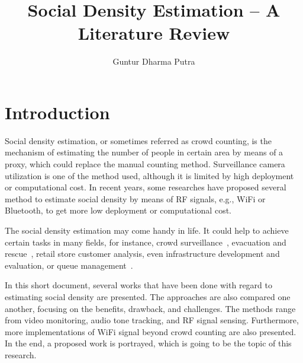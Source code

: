 \documentclass{article}
\begin{document}
\title{Social Density Estimation -- A Literature Review}
\author{Guntur Dharma Putra}

\maketitle



\section{Introduction} %
\label{sec:introduction}
Social density estimation, or sometimes referred as crowd counting, is the mechanism of estimating the number of people in certain area by means of a proxy, which could replace the manual counting method. Surveillance camera utilization is one of the method used, although it is limited by high deployment or computational cost. In recent years, some researches have proposed several method to estimate social density by means of RF signals, e.g., WiFi or Bluetooth, to get more low deployment or computational cost.

The social density estimation may come handy in life. It could help to achieve certain tasks in many fields, for instance, crowd surveillance~\cite{thesis050}, evacuation and rescue~\cite{thesis045}, retail store customer analysis, even infrastructure development and evaluation, or queue management~\cite{thesis012}.

In this short document, several works that have been done with regard to estimating social density are presented. The approaches are also compared one another, focusing on the benefits, drawback, and challenges. The methods range from video monitoring, audio tone tracking, and RF signal sensing. Furthermore, more implementations of WiFi signal beyond crowd counting are also presented. In the end, a proposed work is portrayed, which is going to be the topic of this research.

\end{document}
